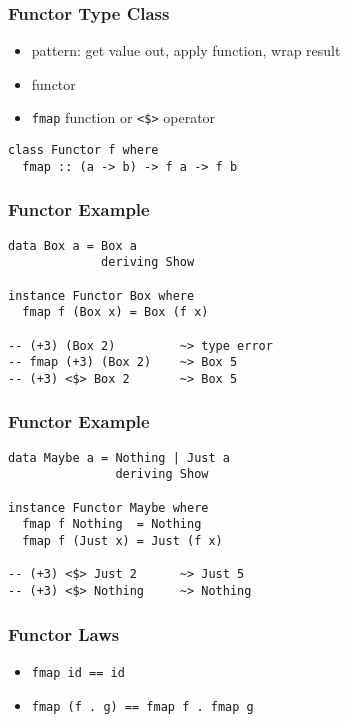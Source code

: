 \documentclass[dvipsnames]{beamer}
\theoremstyle{plain}
\begin{document}
\begin{frame}[fragile]
  \frametitle{Functor Type Class}

  \begin{itemize}
    \item pattern: get value out, apply function, wrap result
    \item \alert{functor}
    \item \lstinline|fmap| function or \lstinline|<$>| operator
  \end{itemize}

  \begin{lstlisting}
class Functor f where
  fmap :: (a -> b) -> f a -> f b
  \end{lstlisting}
\end{frame}

\begin{frame}[fragile]
  \frametitle{Functor Example}

  \begin{lstlisting}
data Box a = Box a
             deriving Show

instance Functor Box where
  fmap f (Box x) = Box (f x)

-- (+3) (Box 2)         ~> type error
-- fmap (+3) (Box 2)    ~> Box 5
-- (+3) <$> Box 2       ~> Box 5
  \end{lstlisting}
\end{frame}

\begin{frame}[fragile]
  \frametitle{Functor Example}

  \begin{lstlisting}
data Maybe a = Nothing | Just a
               deriving Show

instance Functor Maybe where
  fmap f Nothing  = Nothing
  fmap f (Just x) = Just (f x)

-- (+3) <$> Just 2      ~> Just 5
-- (+3) <$> Nothing     ~> Nothing
  \end{lstlisting}
\end{frame}

\begin{frame}
  \frametitle{Functor Laws}

  \begin{itemize}
    \item \lstinline|fmap id == id|

    \medskip
    \item \lstinline|fmap (f . g) == fmap f . fmap g|
  \end{itemize}
\end{frame}
\end{document}
